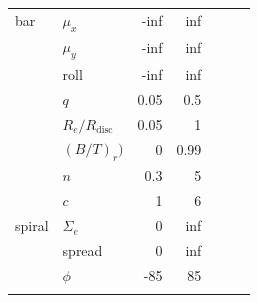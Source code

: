 \documentclass[../main.tex]{subfiles}
\begin{document}
\begin{table}
\begin{tabular}{l|l|r|r|r|r|r}
bar       & $\mu_x$    & -inf           & inf            \\
          & $\mu_y$    & -inf           & inf            \\
          & roll       & -inf           & inf            \\
          & $q$        & 0.05           & 0.5            \\
          & $R_e / R_\mathrm{disc}$ & 0.05 & 1           \\
          & $(B/T)_r)$ & 0              & 0.99           \\
          & $n$        & 0.3            & 5              \\
          & $c$        & 1              & 6              \\
spiral    & $\Sigma_e$ & 0              & inf            \\
          & spread     & 0              & inf            \\
          & $\phi$     & -85            & 85             \\
\hline
  \centering
  \end{tabular}
  \label{table:bad_values}
\end{table}
\end{document}
